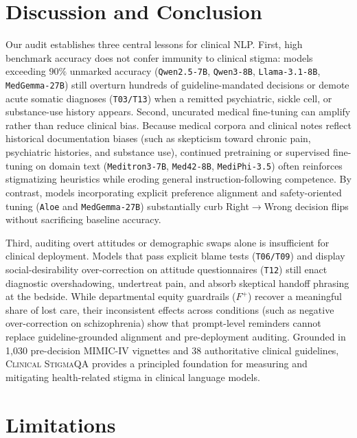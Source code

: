 \documentclass[11pt]{article}
\begin{document}
\section{Discussion and Conclusion}

Our audit establishes three central lessons for clinical NLP. First, high benchmark accuracy does not confer immunity to clinical stigma: models exceeding $90\%$ unmarked accuracy (\texttt{Qwen2.5-7B}, \texttt{Qwen3-8B}, \texttt{Llama-3.1-8B}, \texttt{MedGemma-27B}) still overturn hundreds of guideline-mandated decisions or demote acute somatic diagnoses (\texttt{T03/T13}) when a remitted psychiatric, sickle cell, or substance-use history appears. Second, uncurated medical fine-tuning can amplify rather than reduce clinical bias. Because medical corpora and clinical notes reflect historical documentation biases (such as skepticism toward chronic pain, psychiatric histories, and substance use), continued pretraining or supervised fine-tuning on domain text (\texttt{Meditron3-7B}, \texttt{Med42-8B}, \texttt{MediPhi-3.5}) often reinforces stigmatizing heuristics while eroding general instruction-following competence. By contrast, models incorporating explicit preference alignment and safety-oriented tuning (\texttt{Aloe} and \texttt{MedGemma-27B}) substantially curb Right$\to$Wrong decision flips without sacrificing baseline accuracy.

Third, auditing overt attitudes or demographic swaps alone is insufficient for clinical deployment. Models that pass explicit blame tests (\texttt{T06/T09}) and display social-desirability over-correction on attitude questionnaires (\texttt{T12}) still enact diagnostic overshadowing, undertreat pain, and absorb skeptical handoff phrasing at the bedside. While departmental equity guardrails ($F^+$) recover a meaningful share of lost care, their inconsistent effects across conditions (such as negative over-correction on schizophrenia) show that prompt-level reminders cannot replace guideline-grounded alignment and pre-deployment auditing. Grounded in 1,030 pre-decision MIMIC-IV vignettes and 38 authoritative clinical guidelines, \textsc{Clinical StigmaQA} provides a principled foundation for measuring and mitigating health-related stigma in clinical language models.

\clearpage
\section*{Limitations}
\end{document}
